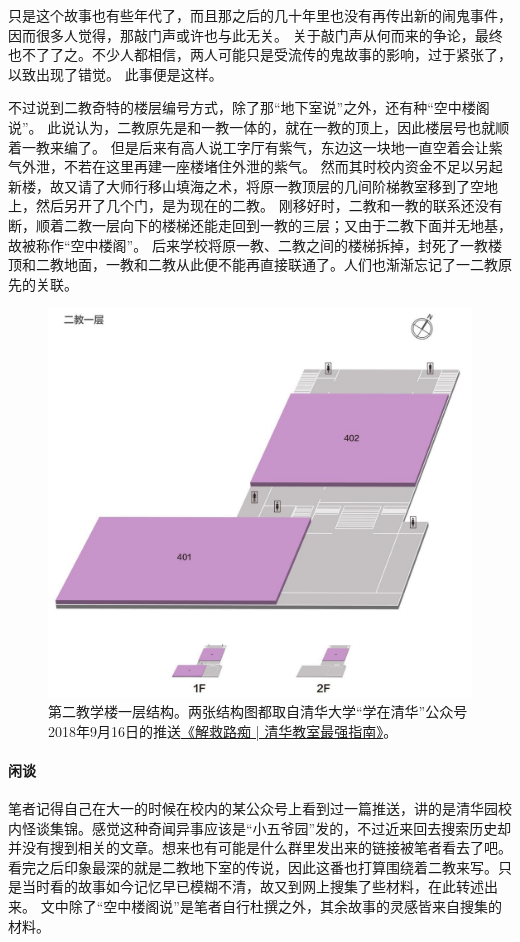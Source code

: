 只是这个故事也有些年代了，而且那之后的几十年里也没有再传出新的闹鬼事件，因而很多人觉得，那敲门声或许也与此无关。
关于敲门声从何而来的争论，最终也不了了之。不少人都相信，两人可能只是受流传的鬼故事的影响，过于紧张了，以致出现了错觉。
此事便是这样。

不过说到二教奇特的楼层编号方式，除了那“地下室说”之外，还有种“空中楼阁说”。
此说认为，二教原先是和一教一体的，就在一教的顶上，因此楼层号也就顺着一教来编了。
但是后来有高人说工字厅有紫气，东边这一块地一直空着会让紫气外泄，不若在这里再建一座楼堵住外泄的紫气。
然而其时校内资金不足以另起新楼，故又请了大师行移山填海之术，将原一教顶层的几间阶梯教室移到了空地上，然后另开了几个门，是为现在的二教。
刚移好时，二教和一教的联系还没有断，顺着二教一层向下的楼梯还能走回到一教的三层；又由于二教下面并无地基，故被称作“空中楼阁”。
后来学校将原一教、二教之间的楼梯拆掉，封死了一教楼顶和二教地面，一教和二教从此便不能再直接联通了。人们也渐渐忘记了一二教原先的关联。

\begin{figure}[!t]
	\centering
	\includegraphics[width=\linewidth]{figures/二教一层.jpg}
	第二教学楼一层结构。两张结构图都取自清华大学“学在清华”公众号2018年9月16日的推送\href{https://mp.weixin.qq.com/s/SHW-wviq3NYemcHZBRgi5w}{《解救路痴 | 清华教室最强指南》}。
\end{figure}

\vfill

\paragraph{闲谈}
笔者记得自己在大一的时候在校内的某公众号上看到过一篇推送，讲的是清华园校内怪谈集锦。感觉这种奇闻异事应该是“小五爷园”发的，不过近来回去搜索历史却并没有搜到相关的文章。想来也有可能是什么群里发出来的链接被笔者看去了吧。
看完之后印象最深的就是二教地下室的传说，因此这番也打算围绕着二教来写。只是当时看的故事如今记忆早已模糊不清，故又到网上搜集了些材料，在此转述出来。
文中除了“空中楼阁说”是笔者自行杜撰之外，其余故事的灵感皆来自搜集的材料。

